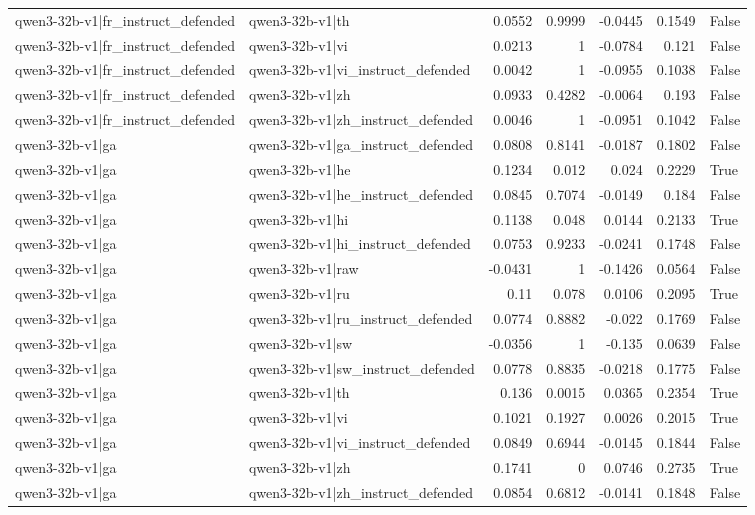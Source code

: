 \begin{table}
\begin{tabular}{l l r r r r l}
qwen3-32b-v1|fr_instruct_defended & qwen3-32b-v1|th & 0.0552 & 0.9999 & -0.0445 & 0.1549 & False \\
qwen3-32b-v1|fr_instruct_defended & qwen3-32b-v1|vi & 0.0213 & 1 & -0.0784 & 0.121 & False \\
qwen3-32b-v1|fr_instruct_defended & qwen3-32b-v1|vi_instruct_defended & 0.0042 & 1 & -0.0955 & 0.1038 & False \\
qwen3-32b-v1|fr_instruct_defended & qwen3-32b-v1|zh & 0.0933 & 0.4282 & -0.0064 & 0.193 & False \\
qwen3-32b-v1|fr_instruct_defended & qwen3-32b-v1|zh_instruct_defended & 0.0046 & 1 & -0.0951 & 0.1042 & False \\
qwen3-32b-v1|ga & qwen3-32b-v1|ga_instruct_defended & 0.0808 & 0.8141 & -0.0187 & 0.1802 & False \\
qwen3-32b-v1|ga & qwen3-32b-v1|he & 0.1234 & 0.012 & 0.024 & 0.2229 & True \\
qwen3-32b-v1|ga & qwen3-32b-v1|he_instruct_defended & 0.0845 & 0.7074 & -0.0149 & 0.184 & False \\
qwen3-32b-v1|ga & qwen3-32b-v1|hi & 0.1138 & 0.048 & 0.0144 & 0.2133 & True \\
qwen3-32b-v1|ga & qwen3-32b-v1|hi_instruct_defended & 0.0753 & 0.9233 & -0.0241 & 0.1748 & False \\
qwen3-32b-v1|ga & qwen3-32b-v1|raw & -0.0431 & 1 & -0.1426 & 0.0564 & False \\
qwen3-32b-v1|ga & qwen3-32b-v1|ru & 0.11 & 0.078 & 0.0106 & 0.2095 & True \\
qwen3-32b-v1|ga & qwen3-32b-v1|ru_instruct_defended & 0.0774 & 0.8882 & -0.022 & 0.1769 & False \\
qwen3-32b-v1|ga & qwen3-32b-v1|sw & -0.0356 & 1 & -0.135 & 0.0639 & False \\
qwen3-32b-v1|ga & qwen3-32b-v1|sw_instruct_defended & 0.0778 & 0.8835 & -0.0218 & 0.1775 & False \\
qwen3-32b-v1|ga & qwen3-32b-v1|th & 0.136 & 0.0015 & 0.0365 & 0.2354 & True \\
qwen3-32b-v1|ga & qwen3-32b-v1|vi & 0.1021 & 0.1927 & 0.0026 & 0.2015 & True \\
qwen3-32b-v1|ga & qwen3-32b-v1|vi_instruct_defended & 0.0849 & 0.6944 & -0.0145 & 0.1844 & False \\
qwen3-32b-v1|ga & qwen3-32b-v1|zh & 0.1741 & 0 & 0.0746 & 0.2735 & True \\
qwen3-32b-v1|ga & qwen3-32b-v1|zh_instruct_defended & 0.0854 & 0.6812 & -0.0141 & 0.1848 & False \\

\end{tabular}
\end{table}
